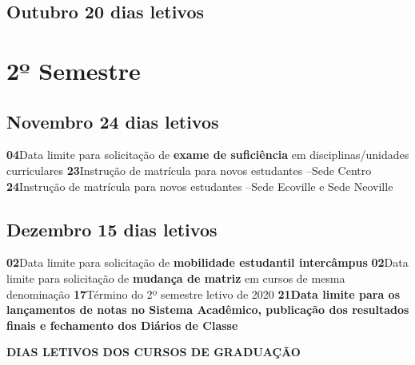 \documentclass[thesis]{hmcposter}
\begin{document}
\begin{poster}
 \subsection{Outubro \hfill 20 dias letivos} \null \newline \vfill\null
\columnbreak
\section{\hfill \color{hmcorange}2º Semestre}
\subsection{Novembro \hfill 24 dias letivos}\textbf{04}\qquad Data limite para solicitação de \textbf{exame de suficiência} em disciplinas/unidades curriculares \newline\textbf{23}\qquad Instrução de matrícula para novos estudantes –Sede Centro
 \newline\textbf{24}\qquad Instrução de matrícula para novos estudantes –Sede Ecoville e Sede Neoville \subsection{Dezembro \hfill 15 dias letivos}\textbf{02}\qquad Data limite para solicitação de \textbf{mobilidade estudantil intercâmpus} \newline\textbf{02}\qquad Data limite para solicitação de \textbf{mudança de matriz} em cursos de mesma denominação \newline\textbf{17}\qquad Término do 2º semestre letivo de 2020 \newline\textbf{21}\qquad \textbf{Data limite para os lançamentos de notas no Sistema Acadêmico, publicação dos resultados finais e fechamento dos Diários de Classe} \newpage
~
\vfill
\begin{center}
\large \textbf{DIAS LETIVOS DOS CURSOS DE GRADUAÇÃO}
\newline
\null
\newline
\begin{table}
\centering
{}
\end{table}
\end{center}
\end{poster}
\end{document}
